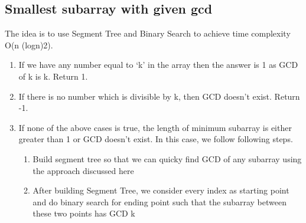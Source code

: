 \documentclass[8pt, a4paper, oneside, twocolumn]{extarticle}
\begin{document}
\subsection{Smallest subarray with given gcd}
The idea is to use Segment Tree and Binary Search to achieve time complexity O(n (logn)2).
\begin{enumerate}
    \item If we have any number equal to ‘k’ in the array then the answer is 1 as GCD of k is k. Return 1.
    \item If there is no number which is divisible by k, then GCD doesn’t exist. Return -1.
    \item If none of the above cases is true, the length of minimum subarray is either greater than 1 or GCD doesn’t exist. In this case, we follow following steps.
        \begin{enumerate}
        \item Build segment tree so that we can quicky find GCD of any subarray using the approach discussed here
        \item After building Segment Tree, we consider every index as starting point and do binary search for ending point such that the subarray between these two points has GCD k
        \end{enumerate}
\end{enumerate}
\end{document}
